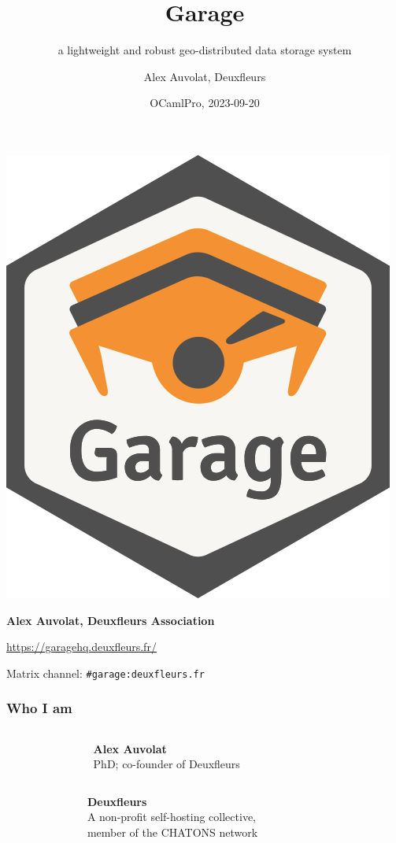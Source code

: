 \documentclass[aspectratio=169]{beamer}
\title{Garage}
\subtitle{a lightweight and robust geo-distributed data storage system}
\author{Alex Auvolat, Deuxfleurs}
\date{OCamlPro, 2023-09-20}
\begin{document}
\begin{frame}
	\centering
	\includegraphics[width=.3\linewidth]{../../sticker/Garage.png}
	\vspace{1em}

	{\large\bf Alex Auvolat, Deuxfleurs Association}
	\vspace{1em}

	\url{https://garagehq.deuxfleurs.fr/}

	Matrix channel: \texttt{\#garage:deuxfleurs.fr}
\end{frame}

\begin{frame}
	\frametitle{Who I am}
	\begin{columns}[t]
		\begin{column}{.2\textwidth}
			\centering
		\end{column}
		\begin{column}{.6\textwidth}
			\textbf{Alex Auvolat}\\
			PhD; co-founder of Deuxfleurs
		\end{column}
		\begin{column}{.2\textwidth}
			~
		\end{column}
	\end{columns}
	\vspace{2em}

	\begin{columns}[t]
		\begin{column}{.2\textwidth}
			\centering
		\end{column}
		\begin{column}{.6\textwidth}
			\textbf{Deuxfleurs}\\
			A non-profit self-hosting collective,\\
			member of the CHATONS network
		\end{column}
		\begin{column}{.2\textwidth}
			\centering
		\end{column}
	\end{columns}

\end{frame}
\end{document}
